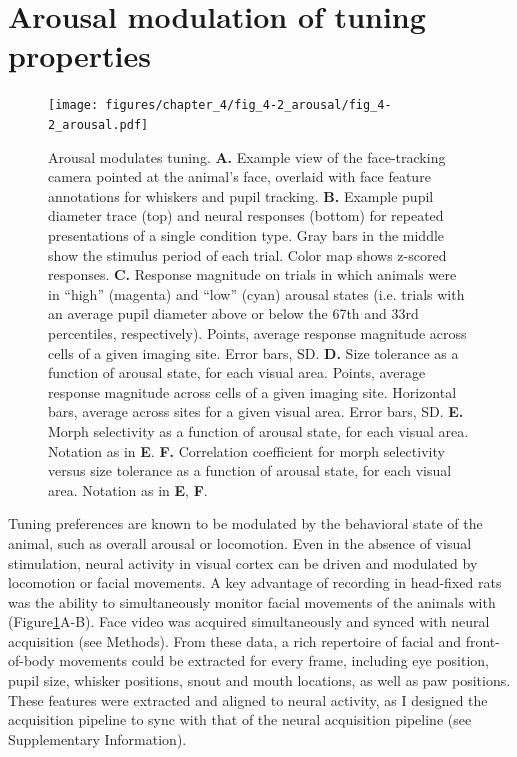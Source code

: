 \section{Arousal modulation of tuning properties} 
\begin{figure}[t!]
    \texttt{[image: figures/chapter\_4/fig\_4-2\_arousal/fig\_4-2\_arousal.pdf]}
    \caption[Arousal modulates tuning]{Arousal modulates tuning. 
    \textbf{A.} Example view of the face-tracking camera pointed at the animal’s face, overlaid with face feature annotations for whiskers and pupil tracking.
    \textbf{B.} Example pupil diameter trace (top) and neural responses (bottom) for repeated presentations of a single condition type. Gray bars in the middle show the stimulus period of each trial. Color map shows z-scored responses.
    \textbf{C.} Response magnitude on trials in which animals were in “high” (magenta) and “low” (cyan) arousal states (i.e. trials with an average pupil diameter above or below the 67th and 33rd percentiles, respectively). Points, average response magnitude across cells of a given imaging site. Error bars, SD.
    \textbf{D.} Size tolerance as a function of arousal state, for each visual area. Points, average response magnitude across cells of a given imaging site. Horizontal bars, average across sites for a given visual area. Error bars, SD.
    \textbf{E.} Morph selectivity as a function of arousal state, for each visual area. Notation as in \textbf{E}.
    \textbf{F.} Correlation coefficient for morph selectivity versus size tolerance as a function of arousal state, for each visual area. Notation as in \textbf{E}, \textbf{F}.
    \label{fig:arousal}}
\end{figure}

Tuning preferences are known to be modulated by the behavioral state of the animal, such as overall arousal or locomotion\cite{Niell2010,Saleem2013,Vinck2015, Dadarlat2017}. Even in the absence of visual stimulation, neural activity in visual cortex can be driven and modulated by locomotion or facial movements\cite{Keller2012SensorimotorMouse, Stringer2019spontaneous}. A key advantage of recording in head-fixed rats was the ability to simultaneously monitor facial movements of the animals with (Figure\ref{fig:arousal}A-B). Face video was acquired simultaneously and synced with neural acquisition (see Methods). From these data, a rich repertoire of facial and front-of-body movements could be extracted for every frame, including eye position, pupil size, whisker positions, snout and mouth locations, as well as paw positions. These features were extracted\cite{Mathis2018, Nath2019} and aligned to neural activity, as I designed the acquisition pipeline to sync with that of the neural acquisition pipeline (see Supplementary Information).

